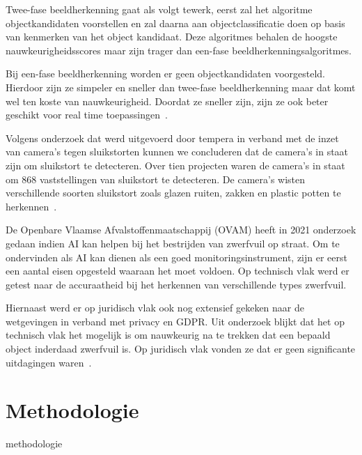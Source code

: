 \documentclass{hogent-article}
\begin{document}
Twee-fase beeldherkenning gaat als volgt tewerk, eerst zal het algoritme objectkandidaten voorstellen en zal daarna aan objectclassificatie doen op basis van kenmerken van het object kandidaat. Deze algoritmes behalen de hoogste nauwkeurigheidsscores maar zijn trager dan een-fase beeldherkenningsalgoritmes.

Bij een-fase beeldherkenning worden er geen objectkandidaten voorgesteld. Hierdoor zijn ze simpeler en sneller dan twee-fase beeldherkenning maar dat komt wel ten koste van nauwkeurigheid. Doordat ze sneller zijn, zijn ze ook beter geschikt voor real time toepassingen~\autocite{Boesch}.

Volgens onderzoek dat werd uitgevoerd door tempera in verband met de inzet van camera’s tegen sluikstorten kunnen we concluderen dat de camera’s in staat zijn om sluikstort te detecteren. Over tien projecten waren de camera’s in staat om 868 vaststellingen van sluikstort te detecteren. De camera’s wisten verschillende soorten sluikstort zoals glazen ruiten, zakken en plastic potten te herkennen~\autocite{Albertijn2019}.

De Openbare Vlaamse Afvalstoffenmaatschappij (OVAM) heeft in 2021 onderzoek gedaan indien AI kan helpen bij het bestrijden van zwerfvuil op straat. Om te ondervinden als AI kan dienen als een goed monitoringsinstrument, zijn er eerst een aantal eisen opgesteld waaraan het moet voldoen. Op technisch vlak werd er getest naar de accuraatheid bij het herkennen van verschillende types zwerfvuil. 

Hiernaast werd er op juridisch vlak ook nog extensief gekeken naar de wetgevingen in verband met privacy en GDPR. Uit onderzoek blijkt dat het op technisch vlak het mogelijk is om nauwkeurig na te trekken dat een bepaald object inderdaad zwerfvuil is. Op juridisch vlak vonden ze dat er geen significante uitdagingen waren~\autocite{Berth2011}.
\section{Methodologie}


methodologie
\end{document}
